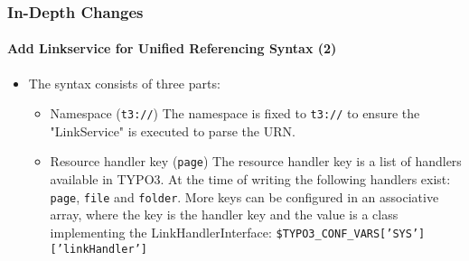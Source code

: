 \begin{frame}[fragile]
	\frametitle{In-Depth Changes}
	\framesubtitle{Add Linkservice for Unified Referencing Syntax (2)}

	\begin{itemize}

		\item The syntax consists of three parts:

			\begin{itemize}

				\item Namespace (\texttt{t3://})\newline
		   			The namespace is fixed to \texttt{t3://} to ensure the "LinkService" is executed to parse the URN.
					\newline
				\item Resource handler key (\texttt{page})\newline
   					The resource handler key is a list of handlers available in TYPO3.
					At the time of writing the following handlers exist: \texttt{page}, \texttt{file} and \texttt{folder}.\newline
					More keys can be configured in an associative array, where the key is the handler key and the value
					is a class implementing the LinkHandlerInterface:\newline
					\texttt{\$TYPO3\_CONF\_VARS['SYS']['linkHandler']}

			\end{itemize}

	\end{itemize}

\end{frame}

